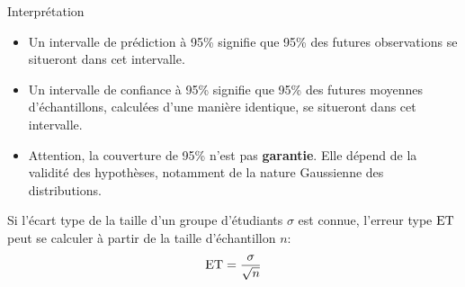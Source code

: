 \begin{frame}{Interprétation}
	\begin{itemize}
		\item Un intervalle de prédiction à 95\% signifie que 95\% des futures observations se situeront dans cet intervalle.
		\pause
		\item Un intervalle de confiance à 95\% signifie que 95\% des futures moyennes d'échantillons, calculées d'une manière identique, se situeront dans cet intervalle.
		\pause
		\item Attention, la couverture de 95\% n'est pas \textbf{garantie}. Elle dépend de la validité des hypothèses, notamment de la nature Gaussienne des distributions.
	\end{itemize}
	\pause
	Si l'écart type de la taille d'un groupe d'étudiants $\sigma$ est connue, l'erreur type $\ET$ peut se calculer à partir de la taille d'échantillon $n$:
	\begin{equation}
		\ET = \frac{\sigma}{\sqrt{n}}
		\nonumber
	\end{equation}
\end{frame}